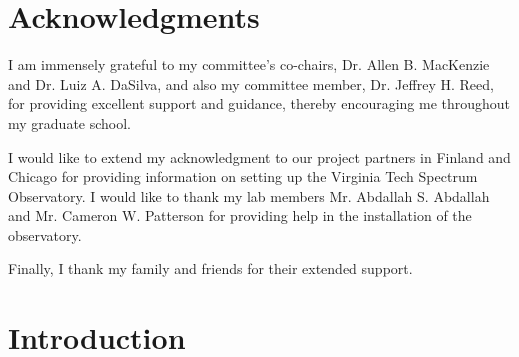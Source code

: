 \documentclass[12pt,sts]{report}
\begin{document}
\vfill

\pagebreak


\tableofcontents

\pagebreak

\listoffigures
\pagebreak

\listoftables
\pagebreak

\section*{Acknowledgments}

I am immensely grateful to my committee's co-chairs, Dr. Allen B. MacKenzie and Dr. Luiz A. DaSilva, and also my committee member, Dr. Jeffrey H. Reed, for providing excellent support and guidance, thereby encouraging me throughout my graduate school.

I would like to extend my acknowledgment to our project partners in Finland and Chicago for providing information on setting up the Virginia Tech Spectrum Observatory. I would like to thank my lab members Mr. Abdallah S. Abdallah and Mr. Cameron W. Patterson for providing help in the installation of the observatory.

Finally, I thank my family and friends for their extended support.
\pagebreak

\pagestyle{myheadings}

\renewcommand\thesection{\arabic{section}}

\section{Introduction}
\end{document}
